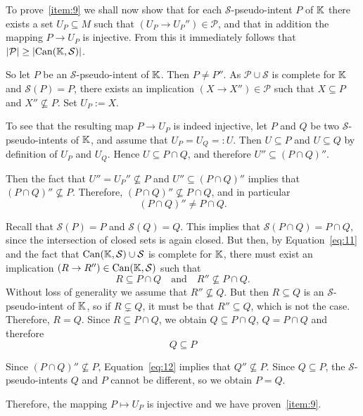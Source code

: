 \begin{Proof}
  To prove~\ref{item:9} we shall now show that for each $\mathcal{S}$-pseudo-intent $P$ of
  ${\mathbb{K}}$ there exists a set $U_P \subseteq M$ such that $(U_P \to U_P'') \in
  \mathcal{P}$, and that in addition the mapping $P \to U_P$ is injective.  From this it
  immediately follows that $\lvert\mathcal{P}\rvert \ge \lvert \operatorname{Can}({\mathbb{K}}, \mathcal{S}) \rvert$.

  So let $P$ be an $\mathcal{S}$-pseudo-intent of ${\mathbb{K}}$.  Then $P \neq P''$.  As
  $\mathcal{P} \cup \mathcal{S}$ is complete for ${\mathbb{K}}$ and $\mathcal{S}(P) = P$, there
  exists an implication $(X \to X'') \in \mathcal{P}$ such that $X \subseteq P$ and $X''
  \not\subseteq P$.  Set $U_P := X$.

  To see that the resulting map $P \to U_P$ is indeed injective, let $P$ and $Q$ be two
  $\mathcal{S}$-pseudo-intents of ${\mathbb{K}}$, and assume that $U_P = U_Q =: U$.  Then $U
  \subseteq P$ and $U \subseteq Q$ by definition of $U_P$ and $U_Q$.  Hence $U \subseteq P
  \cap Q$, and therefore $U'' \subseteq (P \cap Q)''$.

  Then the fact that $U'' = U_P'' \not\subseteq P$ and $U'' \subseteq (P \cap Q)''$ implies
  that $(P \cap Q)'' \not\subseteq P$.  Therefore, $(P \cap Q)'' \not\subseteq P \cap Q$,
  and in particular
  \begin{equation}
    \label{eq:11}
    (P \cap Q)'' \neq P \cap Q.
  \end{equation}

  Recall that $\mathcal{S}(P) = P$ and $\mathcal{S}(Q) = Q$.  This implies that
  $\mathcal{S}(P \cap Q) = P \cap Q$, since the intersection of closed sets is again
  closed.  But then, by Equation~\eqref{eq:11} and the fact that $\operatorname{Can}({\mathbb{K}},
  \mathcal{S}) \cup \mathcal{S}$ is complete for ${\mathbb{K}}$, there must exist an implication
  $(R \to R'') \in \operatorname{Can}({\mathbb{K}}, \mathcal{S})$ such that
  \begin{equation*}
    R \subseteq P \cap Q \quad\text{and}\quad R'' \not\subseteq P \cap Q.
  \end{equation*}
  Without loss of generality we assume that $R'' \not\subseteq Q$.  But then $R \subseteq
  Q$ is an $\mathcal{S}$-pseudo-intent of ${\mathbb{K}}$, so if $R \subsetneq Q$, it must be
  that $R'' \subseteq Q$, which is not the case.  Therefore, $R = Q$.  Since $R \subseteq
  P \cap Q$, we obtain $Q \subseteq P \cap Q$, \ie $Q = P \cap Q$ and therefore
  \begin{equation}
    \label{eq:12}
    Q \subseteq P
  \end{equation}

  Since $(P \cap Q)'' \not\subseteq P$, Equation~\eqref{eq:12} implies that $Q''
  \not\subseteq P$.  Since $Q \subseteq P$, the $\mathcal{S}$-pseudo-intents $Q$ and $P$
  cannot be different, so we obtain $P = Q$.

  Therefore, the mapping $P \mapsto U_P$ is injective and we have proven~\ref{item:9}.
\end{Proof}

